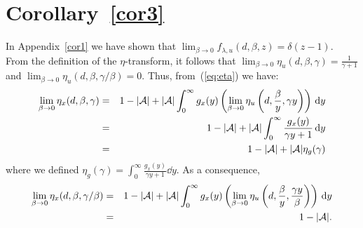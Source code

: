 \documentclass[11pt, draftcls, onecolumn, a4paper]{IEEEtran}
\newcommand{\Ac}{{\cal A}}
\def\non{\nonumber\\}
\begin{document}
\section{Corollary~\ref{cor3}}
\label{app:cor3}
In Appendix~\ref{cor1} we have shown that $\lim_{\beta\rightarrow
  0}f_{\lambda,u}(d,\beta,z) = \delta(z-1)$. From the definition of
the $\eta$-transform, it follows that $\lim_{\beta\rightarrow
  0}\eta_{u}(d,\beta,\gamma) = \frac{1}{\gamma +1}$ and
$\lim_{\beta\rightarrow 0}\eta_{u}(d,\beta,\gamma/\beta) =
0$. Thus, from~(\ref{eq:eta}) we have:
\begin{eqnarray} \lim_{\beta\rightarrow 0} \eta_x(d,\beta,\gamma) 
&=& 1-|\Ac| +|\Ac| \int_0^{\infty}g_x(y)\left( \lim_{\beta\rightarrow 0} \eta_{u}\left(d,\frac{\beta}{y},\gamma y\right)\right)\dd y \non
&=& 1-|\Ac| +|\Ac| \int_0^{\infty}\frac{g_x(y)}{\gamma y +1} \dd y \non
&=& 1-|\Ac| +|\Ac| \eta_g(\gamma)
\end{eqnarray}
where we defined $\eta_g(\gamma) = \int_0^{\infty}\frac{g_x(y)}{\gamma y +1} \dd y$.
As a consequence,
\begin{eqnarray} \lim_{\beta\rightarrow 0} \eta_x(d,\beta,\gamma/\beta) 
&=& 1-|\Ac| +|\Ac| \int_0^{\infty}g_x(y)\left( \lim_{\beta\rightarrow 0} \eta_{u}\left(d,\frac{\beta}{y},\frac{\gamma y}{\beta}\right)\right)\dd y \non
&=& 1-|\Ac| .
\end{eqnarray}
\end{document}
